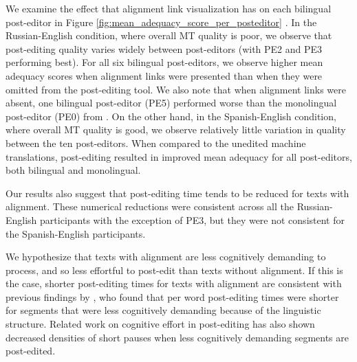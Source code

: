 %
%
%


We examine the effect that alignment link visualization has on each bilingual post-editor in Figure \ref{fig:mean_adequacy_score_per_posteditor} .
%
In the Russian-English condition, where overall MT quality is poor, we observe that post-editing quality varies widely between post-editors (with PE2 and PE3 performing best).
%
For all six bilingual post-editors, we observe higher mean adequacy scores when alignment links were presented than when they were omitted from the post-editing tool.
%
We also note that when alignment links were absent, one bilingual post-editor (PE5) performed worse than the monolingual post-editor (PE0) from \citet{2014_WMT_Schwartz_etal}.
%
On the other hand, in the Spanish-English condition, where overall MT quality is good, we observe relatively little variation in quality between the ten post-editors.
%
When compared to the unedited machine translations, post-editing resulted in improved mean adequacy for all post-editors, both bilingual and monolingual.

Our results also suggest that post-editing time tends to be reduced for texts with alignment. 
%
These numerical reductions were consistent across all the Russian-English participants with the exception of PE3, but they were not consistent for the Spanish-English participants. 

We hypothesize that texts with alignment are less cognitively demanding to process, and so less effortful to post-edit than texts without alignment. 
%
If this is the case, shorter post-editing times for texts with alignment are consistent with previous findings by \citet{2012_AMTA_Koponen_etal}, who found that per word post-editing times were shorter for segments that were less cognitively demanding because of the linguistic structure. 
%
Related work on cognitive effort in post-editing \citep{2014_AMTA_Lacruz_etal,2014_Lacruz_Shreve} has also shown decreased densities of short pauses when less cognitively demanding segments are post-edited. 

